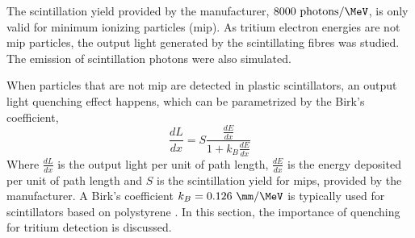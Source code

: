 The scintillation yield provided by the manufacturer, $8000~\text{photons}/\MeV$, is only valid for minimum ionizing particles (mip). As tritium electron energies are not mip particles, the output light generated by the scintillating fibres was studied. The emission of scintillation photons were also simulated.

When particles that are not mip are detected in plastic scintillators, an output light quenching effect happens, which can be parametrized by the Birk's coefficient\cite{BirksPaper}, 
\begin{equation}
\frac{dL}{dx}= S\frac{\displaystyle{\frac{dE}{dx}}}{1+k_B\displaystyle{\frac{dE}{dx}}}
\label{eq:birkscoefficient}
\end{equation}
Where $\displaystyle{\frac{dL}{dx}}$ is the output light per unit of path length, $\displaystyle{\frac{dE}{dx}}$ is the energy deposited per unit of path length and $S$ is the scintillation yield for mips, provided by the manufacturer. A Birk's coefficient $k_B=0.126~\mm/\MeV$ is typically used for scintillators based on polystyrene \cite{BirksCoefficient}. In this section, the importance of quenching for tritium detection is discussed.

